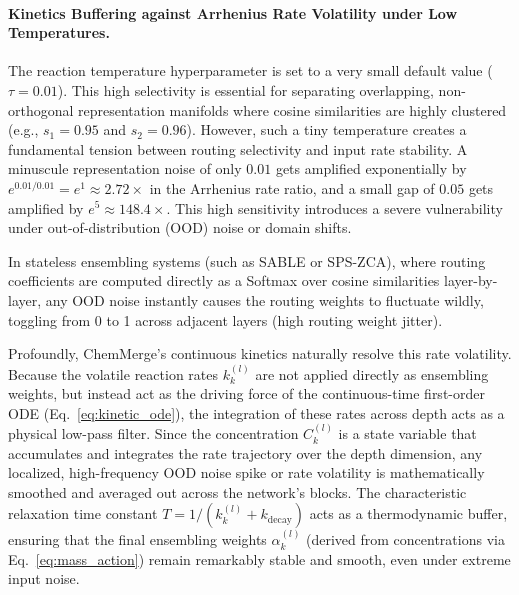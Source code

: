 \paragraph{Kinetics Buffering against Arrhenius Rate Volatility under Low Temperatures.}
The reaction temperature hyperparameter is set to a very small default value ($\tau = 0.01$). This high selectivity is essential for separating overlapping, non-orthogonal representation manifolds where cosine similarities are highly clustered (e.g., $s_1 = 0.95$ and $s_2 = 0.96$). However, such a tiny temperature creates a fundamental tension between routing selectivity and input rate stability. A minuscule representation noise of only $0.01$ gets amplified exponentially by $e^{0.01 / 0.01} = e^1 \approx 2.72\times$ in the Arrhenius rate ratio, and a small gap of $0.05$ gets amplified by $e^5 \approx 148.4\times$. This high sensitivity introduces a severe vulnerability under out-of-distribution (OOD) noise or domain shifts.

In stateless ensembling systems (such as SABLE or SPS-ZCA), where routing coefficients are computed directly as a Softmax over cosine similarities layer-by-layer, any OOD noise instantly causes the routing weights to fluctuate wildly, toggling from 0 to 1 across adjacent layers (high routing weight jitter).

Profoundly, ChemMerge's continuous kinetics naturally resolve this rate volatility. Because the volatile reaction rates $k_k^{(l)}$ are not applied directly as ensembling weights, but instead act as the driving force of the continuous-time first-order ODE (Eq.~\ref{eq:kinetic_ode}), the integration of these rates across depth acts as a physical low-pass filter. Since the concentration $C_k^{(l)}$ is a state variable that accumulates and integrates the rate trajectory over the depth dimension, any localized, high-frequency OOD noise spike or rate volatility is mathematically smoothed and averaged out across the network's blocks. The characteristic relaxation time constant $T = 1 / (k_k^{(l)} + k_{\text{decay}})$ acts as a thermodynamic buffer, ensuring that the final ensembling weights $\alpha_k^{(l)}$ (derived from concentrations via Eq.~\ref{eq:mass_action}) remain remarkably stable and smooth, even under extreme input noise.

